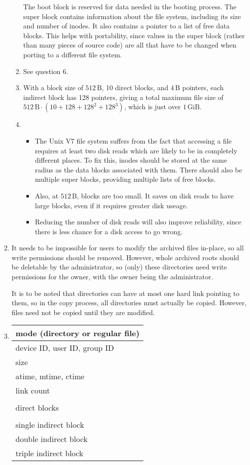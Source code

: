 \documentclass[11pt]{article}
\begin{document}
\begin{enumerate}
\begin{enumerate}
    The boot block is reserved for data needed in the booting process. The super block contains information about the file system, including its size and number of inodes. It also contains a pointer to a list of free data blocks. This helps with portability, since values in the super block (rather than many pieces of source code) are all that have to be changed when porting to a different file system.
  \item See question 6.
  \item With a block size of \(512\,\mathrm{B}\), 10 direct blocks, and \(4\,\mathrm{B}\) pointers, each indirect block has 128 pointers, giving a total maximum file size of \(512\,\mathrm{B}\cdot(10+128+128^2+128^3)\), which is just over \(1\,\mathrm{GiB}\).
  \item
    \begin{itemize}
    \item The Unix V7 file system suffers from the fact that accessing a file requires at least two disk reads which are likely to be in completely different places. To fix this, inodes should be stored at the same radius as the data blocks associated with them. There should also be multiple super blocks, providing multiple lists of free blocks.
    \item Also, at \(512\,\mathrm{B}\), blocks are too small. It saves on disk reads to have large blocks, even if it requires greater disk useage.
    \item Reducing the number of disk reads will also improve reliability, since there is less chance for a disk access to go wrong.
    \end{itemize}
  \end{enumerate}
\item
  It needs to be impossible for users to modify the archived files in-place, so all write permissions should be removed. However, whole archived roots should be deletable by the administrator, so (only) these directories need write permissions for the owner, with the owner being the administrator.

  It is to be noted that directories can have at most one hard link pointing to them, so in the copy process, all directories must actually be copied. However, files need not be copied until they are modified.
\item
  \begin{tabular}[t]{|l|}
    \hline
    mode (directory or regular file)\\
    \hline
    device ID, user ID, group ID\\
    \hline
    size\\
    \hline
    atime, mtime, ctime\\
    \hline
    link count\\
    \hline
    \\direct blocks\\\\
    \hline
    single indirect block\\
    \hline
    double indirect block\\
    \hline
    triple indirect block\\
    \hline
  \end{tabular}


\end{enumerate}
\end{document}
